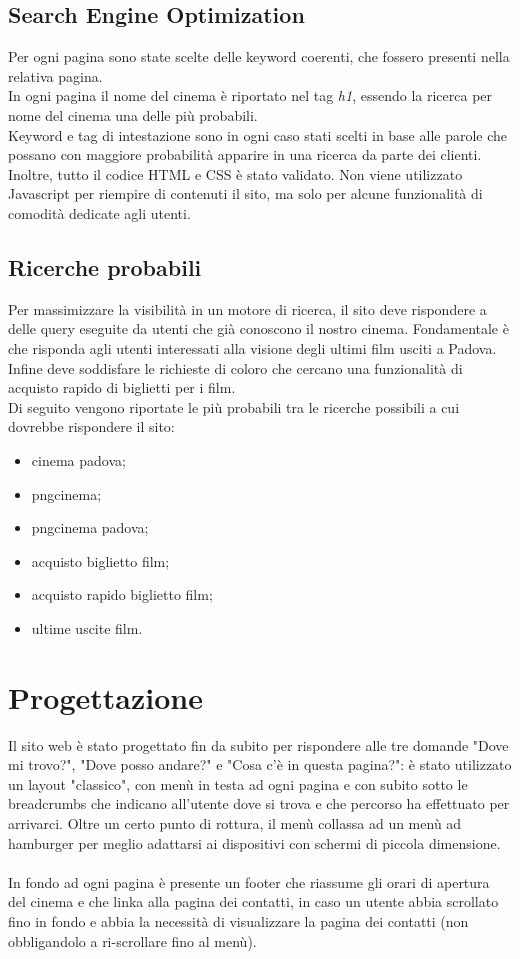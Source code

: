 \documentclass[a4paper, 12pt]{article}
\begin{document}
\subsection{Search Engine Optimization}
Per ogni pagina sono state scelte delle keyword coerenti, che fossero presenti nella relativa pagina.\\
In ogni pagina il nome del cinema è riportato nel tag \textit{h1}, essendo la ricerca per nome del cinema una delle più probabili.\\
Keyword e tag di intestazione sono in ogni caso stati scelti in base alle parole che possano con maggiore probabilità apparire in una ricerca da parte dei clienti.
Inoltre, tutto il codice HTML e CSS è stato validato.
Non viene utilizzato Javascript per riempire di contenuti il sito, ma solo per alcune funzionalità di comodità dedicate agli utenti.

\clearpage

\subsection{Ricerche probabili}
Per massimizzare la visibilità in un motore di ricerca, il sito deve rispondere a delle query eseguite da utenti che già conoscono il nostro cinema. 
Fondamentale è che risponda agli utenti interessati alla visione degli ultimi film usciti a Padova. Infine deve soddisfare le richieste di coloro che cercano una funzionalità di acquisto rapido di biglietti per i film.\\
Di seguito vengono riportate le più probabili tra le ricerche possibili a cui dovrebbe rispondere il sito:

\begin{itemize}
\item cinema padova; 
\item pngcinema;
\item pngcinema padova;
\item acquisto biglietto film;
\item acquisto rapido biglietto film;
\item ultime uscite film.
\end{itemize}

\newpage

\section{Progettazione}
Il sito web è stato progettato fin da subito per rispondere alle tre domande "Dove mi trovo?", "Dove posso andare?" e "Cosa c'è in questa pagina?": è stato utilizzato un layout "classico", con menù in testa ad ogni pagina e con subito sotto le breadcrumbs che indicano all'utente dove si trova e che percorso ha effettuato per arrivarci. Oltre un certo punto di rottura, il menù collassa ad un menù ad hamburger per meglio adattarsi ai dispositivi con schermi di piccola dimensione.\\
\\In fondo ad ogni pagina è presente un footer che riassume gli orari di apertura del cinema e che linka alla pagina dei contatti, in caso un utente abbia scrollato fino in fondo e abbia la necessità di visualizzare la pagina dei contatti (non obbligandolo a ri-scrollare fino al menù).
\end{document}
